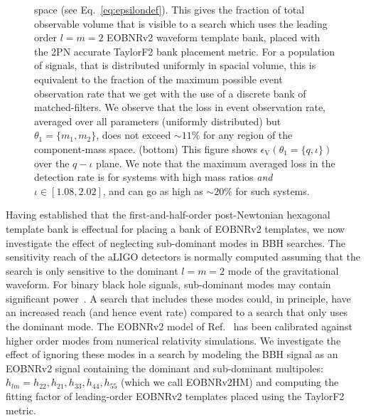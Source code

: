 \begin{figure}
{space (see Eq.~\ref{eq:epsilondef}). 
This gives the 
fraction of total observable volume that is visible to a search which uses the
leading order $l=m=2$ EOBNRv2 waveform template bank, placed with the 2PN 
accurate TaylorF2 bank placement metric. For a population of signals, that is distributed uniformly in spacial volume,
this is equivalent to the fraction of the maximum possible event observation rate that we get with the use of a discrete bank of matched-filters. We observe that the loss in event observation rate,
averaged over all parameters (uniformly distributed) but $\theta_1=\{m_1,m_2\}$,
does not exceed $\sim 11\%$ for any region of the component-mass space.
(bottom) This figure shows $\epsilon_{\mathrm{V}}\left(\theta_1=\{q,\iota\}\right)$ over the $q-\iota$ plane. We note that the 
maximum averaged loss in the detection rate is for systems
with high mass ratios \textit{and} $\iota\in[1.08,2.02]$, and 
can go as high as $\sim 20\%$ for such systems.
} 
\end{figure}

Having established that the first-and-half-order post-Newtonian hexagonal template
bank is effectual for placing a bank of EOBNRv2 templates, we now investigate
the effect of neglecting sub-dominant modes in BBH searches. The sensitivity
reach of the aLIGO detectors is normally computed assuming that the search is
only sensitive to the dominant $l=m=2$ mode of the gravitational waveform. For
binary black hole signals, sub-dominant modes may contain significant
power~\cite{Pekowsky:2012sr}. A search that includes these modes could, in
principle, have an increased reach (and hence event rate) compared to a search
that only uses the dominant mode. The EOBNRv2 model of
Ref.~\cite{BuonannoEOBv2Main} has been calibrated against higher order modes
from numerical relativity simulations. We investigate the effect of ignoring
these modes in a search by modeling the BBH signal as an EOBNRv2 signal
containing the dominant and sub-dominant multipoles: $h_{lm} =
h_{22},h_{21},h_{33},h_{44}, h_{55}$ (which we call EOBNRv2HM) and computing
the fitting factor of leading-order EOBNRv2 templates placed using the
TaylorF2 metric.

